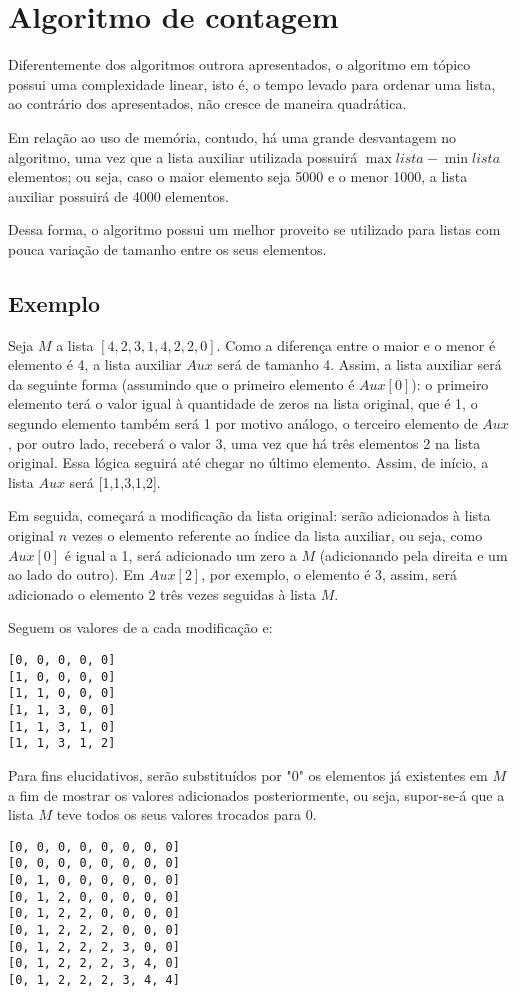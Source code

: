 \section{Algoritmo de contagem}
Diferentemente dos algoritmos outrora apresentados, o algoritmo em tópico possui uma complexidade linear, isto é, o tempo levado para ordenar uma lista, ao contrário dos apresentados, não cresce de maneira quadrática. 

Em relação ao uso de memória, contudo, há uma grande desvantagem no algoritmo, uma vez que a lista auxiliar utilizada possuirá $\max{lista}-\min{lista} $ elementos; ou seja, caso o maior elemento seja 5000 e o menor 1000, a lista auxiliar possuirá de 4000 elementos.

Dessa forma, o algoritmo possui um melhor proveito se utilizado para listas com pouca variação de tamanho entre os seus elementos.

\subsection{Exemplo}
Seja $M$ a lista $[4,2,3,1,4,2,2,0]$. Como a diferença entre o maior e o menor é elemento é 4, a lista auxiliar $Aux$ será de tamanho 4.
Assim, a lista auxiliar será da seguinte forma (assumindo que o primeiro elemento é $Aux[0]$): o primeiro elemento terá o valor igual à quantidade de zeros na lista original, que é 1, o segundo elemento também será 1 por motivo análogo, o terceiro elemento de $Aux$, por outro lado, receberá o valor 3, uma vez que há três elementos 2 na lista original. Essa lógica seguirá até chegar no último elemento.
Assim, de início, a lista $Aux$ será [1,1,3,1,2].

Em seguida, começará a modificação da lista original: serão adicionados à lista original $n$ vezes o elemento referente ao índice da lista auxiliar, ou seja, como $Aux[0]$ é igual a 1, será adicionado um zero a $M$ (adicionando pela direita e um ao lado do outro). Em $Aux[2]$, por exemplo, o elemento é 3, assim, será adicionado o elemento 2 três vezes seguidas à lista $M$.

Seguem os valores de  a cada modificação e:
\begin{lstlisting}
[0, 0, 0, 0, 0]
[1, 0, 0, 0, 0]
[1, 1, 0, 0, 0]
[1, 1, 3, 0, 0]
[1, 1, 3, 1, 0]
[1, 1, 3, 1, 2]
\end{lstlisting}
\newpage
Para fins elucidativos, serão substituídos por "0" os elementos já existentes em $M$ a fim de mostrar os valores adicionados posteriormente, ou seja, supor-se-á que a lista $M$ teve todos os seus valores trocados para 0.
\begin{lstlisting}
[0, 0, 0, 0, 0, 0, 0, 0]
[0, 0, 0, 0, 0, 0, 0, 0]
[0, 1, 0, 0, 0, 0, 0, 0]
[0, 1, 2, 0, 0, 0, 0, 0]
[0, 1, 2, 2, 0, 0, 0, 0]
[0, 1, 2, 2, 2, 0, 0, 0]
[0, 1, 2, 2, 2, 3, 0, 0]
[0, 1, 2, 2, 2, 3, 4, 0]
[0, 1, 2, 2, 2, 3, 4, 4] 
\end{lstlisting}

